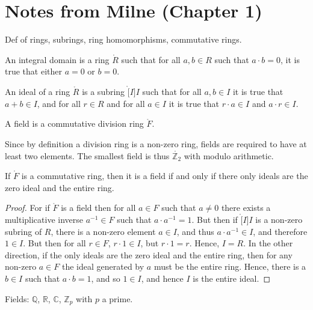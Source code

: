 \section{Notes from Milne (Chapter 1)}
    Def of rings, subrings, ring homomorphisms, commutative rings.
    \begin{definition}
        An integral domain is a ring $\ring{R}$ such that for all
        $a,b\in{R}$ such that $a\cdot{b}=0$, it is true that either $a=0$ or
        $b=0$.
    \end{definition}
    \begin{definition}
        An ideal of a ring $\ring{R}$ is a subring $\ring[I]{I}$ such that
        for all $a,b\in{I}$ it is true that $a+b\in{I}$, and for all
        $r\in{R}$ and for all $a\in{I}$ it is true that $r\cdot{a}\in{I}$
        and $a\cdot{r}\in{I}$.
    \end{definition}
    \begin{definition}
        A field is a commutative division ring $\ring{F}$.
    \end{definition}
    \begin{example}
        Since by definition a division ring is a non-zero ring, fields are
        required to have at least two elements. The smallest field is thus
        $\ring{\mathbb{Z}_{2}}$ with modulo arithmetic.
    \end{example}
    \begin{theorem}
        If $\ring{F}$ is a commutative ring, then it is a field if and only
        if there only ideals are the zero ideal and the entire ring.
    \end{theorem}
    \begin{proof}
        For if $\ring{F}$ is a field then for all $a\in{F}$ such that
        $a\ne{0}$ there exists a multiplicative inverse
        $a^{\minus{1}}\in{F}$ such that $a\cdot{a}^{\minus{1}}=1$. But then
        if $\ring[I]{I}$ is a non-zero subring of $R$, there is a non-zero
        element $a\in{I}$, and thus $a\cdot{a}^{\minus{1}}\in{I}$, and
        therefore $1\in{I}$. But then for all $r\in{F}$, $r\cdot{1}\in{I}$,
        but $r\cdot{1}=r$. Hence, $I=R$. In the other direction, if
        the only ideals are the zero ideal and the entire ring, then for
        any non-zero $a\in{F}$ the ideal generated by $a$ must be the entire
        ring. Hence, there is a $b\in{I}$ such that $a\cdot{b}=1$, and so
        $1\in{I}$, and hence $I$ is the entire ideal.
    \end{proof}
    \begin{example}
        Fields: $\mathbb{Q}$, $\mathbb{R}$, $\mathbb{C}$, $\mathbb{Z}_{p}$
        with $p$ a prime.
    \end{example}
